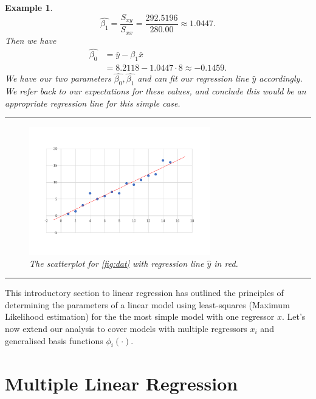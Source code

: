 \documentclass[10pt,a4paper]{article}
\numberwithin{equation}{section}
\theoremstyle{plain}
\theoremstyle{own}
\newtheorem{example}{Example}[section]
\begin{document}
\begin{example}
\begin{equation}
\hat{\beta_1} = \frac{S_{xy}}{S_{xx}} = \frac{292.5196}{280.00} \approx 1.0447.
\end{equation}
Then we have
\begin{align} \nonumber
\hat{\beta_0} & = \bar{y} - \beta_1 \bar{x} \\
 & = 8.2118 - 1.0447 \cdot 8  \approx -0.1459.
\end{align}
We have our two parameters $\hat{\beta_0}, \hat{\beta_1}$ and can fit our regression line $\hat{y}$ accordingly. We refer back to our expectations for these values, and conclude this would be an appropriate regression line for this simple case.
\pagebreak
\hrule
\begin{figure}[H]
\centering
\includegraphics[width = 0.7\textwidth]{data_graphmain}
\caption{The scatterplot for \cref{fig:dat} with regression line $\hat{y}$ in red.}
\label{fig:main}
\end{figure}
\end{example}
\hrule
\vspace{3mm}
This introductory section to linear regression has outlined the principles of determining the parameters of a linear model using least-squares (Maximum Likelihood estimation) for the the most simple model with one regressor $x$. Let's now extend our analysis to cover models with multiple regressors $x_i$ and generalised basis functions $\phi_i(\cdot)$.

\section{Multiple Linear Regression}
\end{document}

